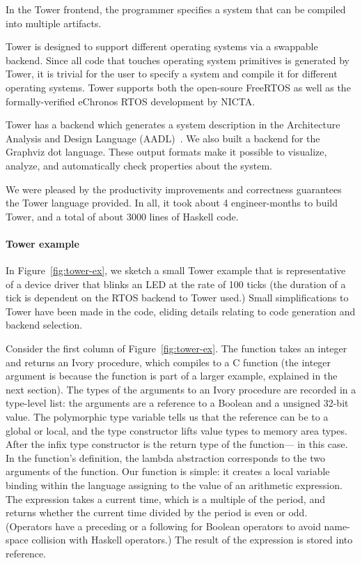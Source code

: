 In the Tower frontend, the programmer specifies a system that can be compiled into
multiple artifacts.

Tower is designed to support different operating systems via a swappable
backend. Since all code that touches operating system primitives is generated by
Tower, it is trivial for the user to specify a system and compile it for
different operating systems. Tower supports both the open-soure
FreeRTOS\cite{freertos} as well as the formally-verified
eChronos RTOS\cite{echronos} development by NICTA.


Tower has a backend which generates a system description in the Architecture
Analysis and Design Language (AADL)~\cite{SAE:AADL}. We also built a backend for
the Graphviz dot language.  These output formats make it possible to visualize,
analyze, and automatically check properties about the system.  %

We were pleased by the productivity improvements and correctness guarantees the
Tower language provided. In all, it took about 4 engineer-months to build Tower,
and a total of about 3000 lines of Haskell code.

\paragraph{Tower example}
In Figure~\ref{fig:tower-ex}, we sketch a small Tower example that is
representative of a device driver that blinks an LED at the rate of 100 ticks
(the duration of a tick is dependent on the RTOS backend to Tower used.)  Small
simplifications to Tower have been made in the code, eliding details relating to
code generation and backend selection.

Consider the first column of Figure~\ref{fig:tower-ex}.
The function takes an
integer and returns an Ivory procedure, which compiles to a C function (the
integer argument is because the function is part of a larger example, explained
in the next section).  The types of the arguments to an Ivory procedure are
recorded in a type-level list: the arguments are a reference to a Boolean and a
unsigned 32-bit value.  The polymorphic type variable  tells us that the
reference can be to a global or local, and the  type constructor
lifts value types to memory area types.  After the infix type constructor
\cd{:->} is the return type of the function--- in this case.  In the
function's definition, the lambda abstraction corresponds to the two arguments
of the function.  Our function is simple: it creates a local variable binding
within the language assigning to  the value of an arithmetic
expression.  The expression takes a current time, which is a multiple of the
period, and returns whether the current time divided by the period is even or
odd.  (Operators have a preceding  or a following  for Boolean
operators to avoid name-space collision with Haskell operators.)  The result of
the expression is stored into  reference.


